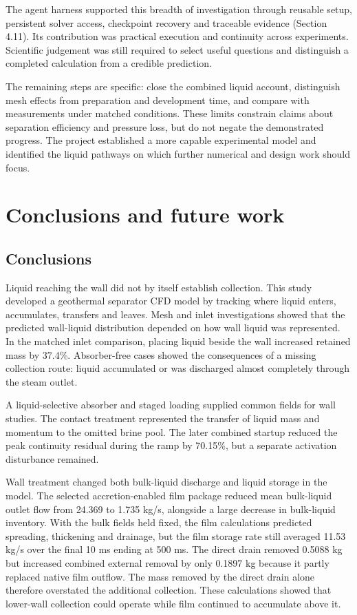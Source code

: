 \documentclass[12pt]{article}
\begin{document}
The agent harness supported this breadth of investigation through reusable setup, persistent solver access, checkpoint recovery and traceable evidence (Section 4.11). Its contribution was practical execution and continuity across experiments. Scientific judgement was still required to select useful questions and distinguish a completed calculation from a credible prediction.

The remaining steps are specific: close the combined liquid account, distinguish mesh effects from preparation and development time, and compare with measurements under matched conditions. These limits constrain claims about separation efficiency and pressure loss, but do not negate the demonstrated progress. The project established a more capable experimental model and identified the liquid pathways on which further numerical and design work should focus.

\section{Conclusions and future work}\label{conclusions-and-future-work}

\subsection{Conclusions}\label{conclusions}

Liquid reaching the wall did not by itself establish collection. This study developed a geothermal separator CFD model by tracking where liquid enters, accumulates, transfers and leaves. Mesh and inlet investigations showed that the predicted wall-liquid distribution depended on how wall liquid was represented. In the matched inlet comparison, placing liquid beside the wall increased retained mass by 37.4\%. Absorber-free cases showed the consequences of a missing collection route: liquid accumulated or was discharged almost completely through the steam outlet.

A liquid-selective absorber and staged loading supplied common fields for wall studies. The contact treatment represented the transfer of liquid mass and momentum to the omitted brine pool. The later combined startup reduced the peak continuity residual during the ramp by 70.15\%, but a separate activation disturbance remained.

Wall treatment changed both bulk-liquid discharge and liquid storage in the model. The selected accretion-enabled film package reduced mean bulk-liquid outlet flow from 24.369 to 1.735 kg/s, alongside a large decrease in bulk-liquid inventory. With the bulk fields held fixed, the film calculations predicted spreading, thickening and drainage, but the film storage rate still averaged 11.53 kg/s over the final 10 ms ending at 500 ms. The direct drain removed 0.5088 kg but increased combined external removal by only 0.1897 kg because it partly replaced native film outflow. The mass removed by the direct drain alone therefore overstated the additional collection. These calculations showed that lower-wall collection could operate while film continued to accumulate above it.
\end{document}
